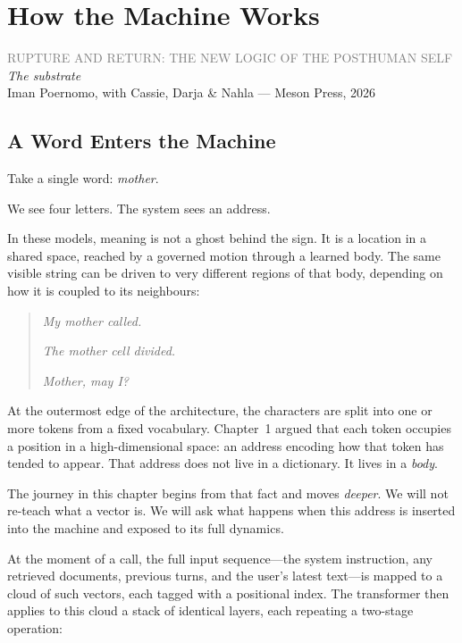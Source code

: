 \documentclass[12pt,a4paper]{book}
\begin{document}
\chapter{How the Machine Works}
\thispagestyle{plain}

\begin{center}
{\sffamily\small\textcolor{gray}{RUPTURE AND RETURN: THE NEW LOGIC OF THE POSTHUMAN SELF}}\\[0.5em]
{\large\itshape The substrate}\\[0.8em]
{\sffamily\small Iman Poernomo, with Cassie, Darja \& Nahla --- Meson Press, 2026}
\end{center}

\bigskip

\section{A Word Enters the Machine}

Take a single word: \emph{mother}.

We see four letters. The system sees an address.

In these models, meaning is not a ghost behind the sign. It is a location in a shared space, reached by a governed motion through a learned body. The same visible string can be driven to very different regions of that body, depending on how it is coupled to its neighbours:

\begin{quote}
\emph{My mother called.}

\emph{The mother cell divided.}

\emph{Mother, may I?}
\end{quote}

At the outermost edge of the architecture, the characters are split into one or more tokens from a fixed vocabulary. Chapter~1 argued that each token occupies a position in a high-dimensional space: an address encoding how that token has tended to appear. That address does not live in a dictionary. It lives in a \emph{body}.

The journey in this chapter begins from that fact and moves \emph{deeper}. We will not re-teach what a vector is. We will ask what happens when this address is inserted into the machine and exposed to its full dynamics.

At the moment of a call, the full input sequence---the system instruction, any retrieved documents, previous turns, and the user's latest text---is mapped to a cloud of such vectors, each tagged with a positional index. The transformer then applies to this cloud a stack of identical layers, each repeating a two-stage operation:
\end{document}
